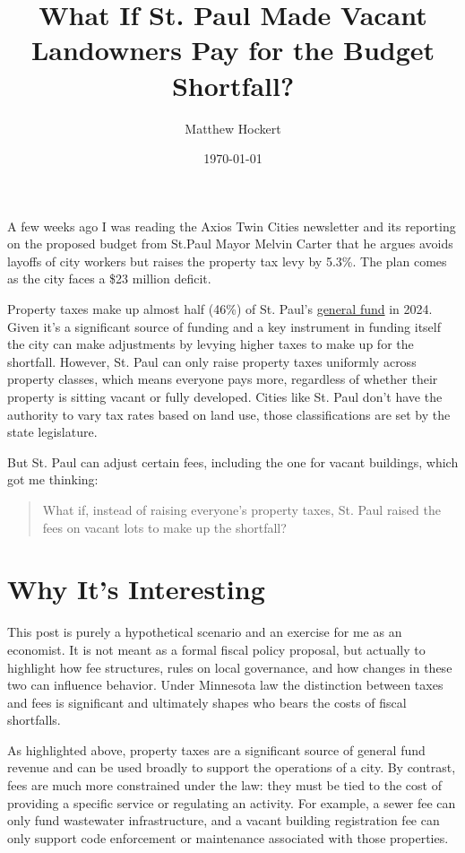 \documentclass[12pt]{article}
\title{What If St. Paul Made Vacant Landowners Pay for the Budget Shortfall?}
\author{Matthew Hockert}
\date{\today}
\begin{document}
\maketitle

A few weeks ago I was reading the Axios Twin Cities newsletter and its reporting on the proposed budget from St.Paul Mayor Melvin Carter that he argues avoids layoffs of city workers but raises the property tax levy by 5.3\%. The plan comes as the city faces a \$23 million deficit.  

Property taxes make up almost half (46\%) of St. Paul's \href{https://www.stpaul.gov/sites/default/files/2024-02/2024%20City%20of%20Saint%20Paul%20Adopted%20Operating%20Budget.pdf}{general fund} in 2024. Given it's a significant source of funding and a key instrument in funding itself the city can make adjustments by levying higher taxes to make up for the shortfall. However, St. Paul can only raise property taxes uniformly across property classes, which means everyone pays more, regardless of whether their property is sitting vacant or fully developed. Cities like St. Paul don’t have the authority to vary tax rates based on land use, those classifications are set by the state legislature.  

But St. Paul can adjust certain fees, including the one for vacant buildings, which got me thinking:  

\begin{quote}
What if, instead of raising everyone’s property taxes, St. Paul raised the fees on vacant lots to make up the shortfall?
\end{quote}

\section*{Why It’s Interesting}

This post is purely a hypothetical scenario and an exercise for me as an economist. It is not meant as a formal fiscal policy proposal, but actually to highlight how fee structures, rules on local governance, and how changes in these two can influence behavior. Under Minnesota law the distinction between taxes and fees is significant and ultimately shapes who bears the costs of fiscal shortfalls.

As highlighted above, property taxes are a significant source of general fund revenue and can be used broadly to support the operations of a city. By contrast, fees are much more constrained under the law: they must be tied to the cost of providing a specific service or regulating an activity. For example, a sewer fee can only fund wastewater infrastructure, and a vacant building registration fee can only support code enforcement or maintenance associated with those properties.
\end{document}
